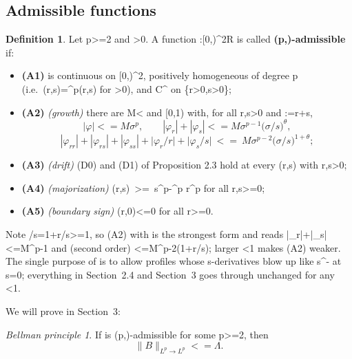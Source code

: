 \documentclass[10pt,reqno]{amsart}
\def\({}\def\){}%
\def\frac#1#2{#1/#2}%
\def\ge{>=}\def\le{<=}%
\providecommand{\tightlist}{\setlength{\itemsep}{0pt}\setlength{\parskip}{0pt}}
\theoremstyle{definition}
\newtheorem{definition}[theorem]{Definition}
\theoremstyle{remark}
\newtheorem*{bellmanprinciple}{Bellman principle}
\begin{document}
\subsection{Admissible functions}\label{subsec:admissible}

\begin{definition}\label{def:admissible}
Let \(p\ge2\) and \(\Lambda>0\). A function \(\varphi:[0,\infty)^2\to\mathbb R\) is called \textbf{\((p,\Lambda)\)-admissible} if:

\begin{itemize}
\tightlist
\item
  \textbf{(A1)} \(\varphi\) is continuous on \([0,\infty)^2\), positively homogeneous of degree \(p\) (i.e.~\(\varphi(\lambda r,\lambda s)=\lambda^p\varphi(r,s)\) for \(\lambda>0\)), and \(C^\infty\) on \(\{r>0,s>0\}\);
\item
  \textbf{(A2)} \emph{(growth)} there are \(M<\infty\) and \(\theta\in[0,1)\) with, for all \(r,s>0\) and \(\sigma:=r+s\), \[|\varphi|\le M\sigma^{p},\qquad
  |\varphi_r|+|\varphi_s|\le M\sigma^{p-1}\Big(\frac\sigma s\Big)^{\theta},\] \[|\varphi_{rr}|+|\varphi_{rs}|+|\varphi_{ss}|+\Big|\frac{\varphi_r}{r}\Big|
  +\Big|\frac{\varphi_s}{s}\Big|\ \le\ M\sigma^{p-2}\Big(\frac\sigma s\Big)^{1+\theta};\]
\item
  \textbf{(A3)} \emph{(drift)} (D0) and (D1) of Proposition 2.3 hold at every \((r,s)\) with \(r,s>0\);
\item
  \textbf{(A4)} \emph{(majorization)} \(\varphi(r,s)\ \ge\ s^p-\Lambda^p r^p\) for all \(r,s\ge0\);
\item
  \textbf{(A5)} \emph{(boundary sign)} \(\varphi(r,0)\le0\) for all \(r\ge0\).
\end{itemize}
\end{definition}

Note \(\sigma/s=1+r/s\ge1\), so (A2) with \(\) is the strongest form and reads \(|\varphi_r|+|\varphi_s|\le M\sigma^{p-1}\) and (second order) \(\le M\sigma^{p-2}(1+r/s)\); larger \(\theta<1\) makes (A2) weaker. The single purpose of \(\theta\) is to allow profiles whose \(s\)-derivatives blow up like \(s^{-\theta}\) at \(s=0\); everything in Section~2.4 and Section~3 goes through unchanged for any \(\theta<1\).

We will prove in Section~3:

\begin{bellmanprinciple}
If \(\varphi\) is \((p,\Lambda)\)-admissible for some \(p\ge2\), then
\[\|B\|_{L^p\to L^p}\le\Lambda.\]
\end{bellmanprinciple}
\end{document}
